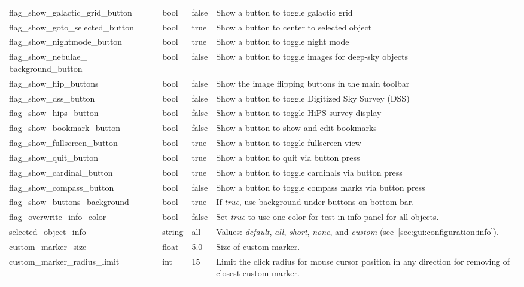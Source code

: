 \begin{longtable}{p{50mm}|l|l|p{55mm}}
flag\_show\_galactic\_grid\_button     & bool  & false & Show a button to toggle galactic grid\\
flag\_show\_goto\_selected\_button     & bool  & true  & Show a button to center to selected object\\
flag\_show\_nightmode\_button          & bool  & true  & Show a button to toggle night mode\\
flag\_show\_nebulae\_ \mbox{background\_button} & bool & false & Show a button to toggle images for deep-sky objects\\%
flag\_show\_flip\_buttons              & bool  & false & Show the image flipping buttons in the main toolbar \\%
flag\_show\_dss\_button                & bool  & false & Show a button to toggle Digitized Sky Survey (DSS)\\%
flag\_show\_hips\_button               & bool  & false & Show a button to toggle HiPS survey display\\%
flag\_show\_bookmark\_button           & bool  & false & Show a button to show and edit bookmarks\\
flag\_show\_fullscreen\_button         & bool  & true  & Show a button to toggle fullscreen view\\
flag\_show\_quit\_button               & bool  & true  & Show a button to quit via button press\\
flag\_show\_cardinal\_button           & bool  & true  & Show a button to toggle cardinals via button press\\
flag\_show\_compass\_button            & bool  & false & Show a button to toggle compass marks via button press\\
flag\_show\_buttons\_background        & bool  & true  & If \emph{true}, use background under buttons on bottom bar.\\\midrule
flag\_overwrite\_info\_color           & bool  & false & Set \emph{true} to use one color for test in info panel for all objects.\\\midrule
%
selected\_object\_info            & string & all  & Values: \emph{default}, \emph{all}, \emph{short}, \emph{none}, 
                                                    and \emph{custom} (see~\ref{sec:gui:configuration:info}).\\\midrule
custom\_marker\_size             & float   & 5.0 & Size of custom marker.\\%
custom\_marker\_radius\_limit    & int   & 15 & Limit the click radius for mouse cursor position in any direction for removing of closest custom marker.\\\midrule

\end{longtable}
